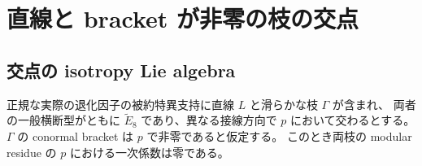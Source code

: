 \section{直線と bracket が非零の枝の交点}
\subsection{交点の isotropy Lie algebra}

\begin{proposition}\label{prop:line-conic-slopes}
正規な実際の退化因子の被約特異支持に直線 $L$ と滑らかな枝 $\Gamma$ が含まれ、
両者の一般横断型がともに $\widetilde E_8$ であり、異なる接線方向で $p$ において交わるとする。
$\Gamma$ の conormal bracket は $p$ で非零であると仮定する。
このとき両枝の modular residue の $p$ における一次係数は零である。
\end{proposition}

